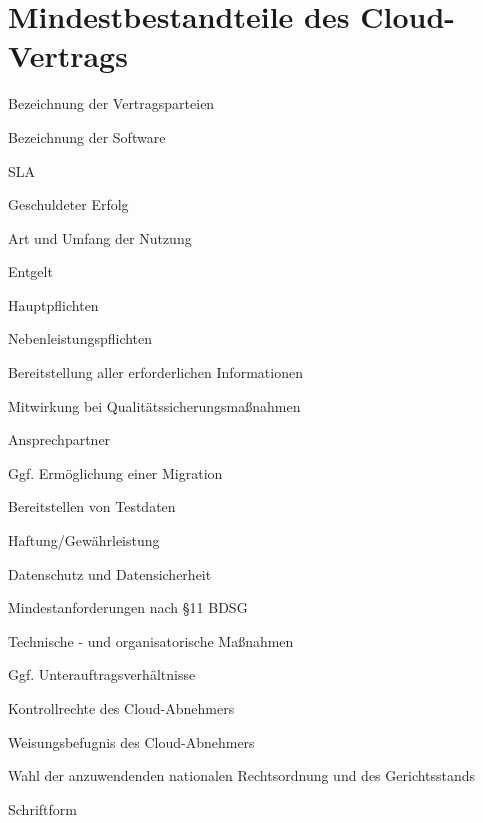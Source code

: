 \section{Mindestbestandteile des Cloud-Vertrags}
\begin{seList}
\item Bezeichnung der Vertragsparteien
\item Bezeichnung der Software
\item SLA
\item Geschuldeter Erfolg
\item Art und Umfang der Nutzung
\item Entgelt
\item Hauptpflichten
\item Nebenleistungspflichten
\begin{seList}                           
\item Bereitstellung aller erforderlichen Informationen
\item Mitwirkung bei Qualit\"atssicherungsma{\ss}nahmen
\item Ansprechpartner
\item Ggf. Erm\"oglichung einer Migration
\item Bereitstellen von Testdaten
\end{seList}     
\item Haftung/Gew\"ahrleistung
\item Datenschutz und Datensicherheit
\begin{seList}                           
\item Mindestanforderungen nach §11 BDSG
\item Technische - und organisatorische Ma{\ss}nahmen
\item Ggf. Unterauftragsverh\"altnisse
\item Kontrollrechte des Cloud-Abnehmers
\item Weisungsbefugnis des Cloud-Abnehmers
\end{seList}                           
\item Wahl der anzuwendenden nationalen Rechtsordnung und des Gerichtsstands
\item Schriftform

\end{seList}



